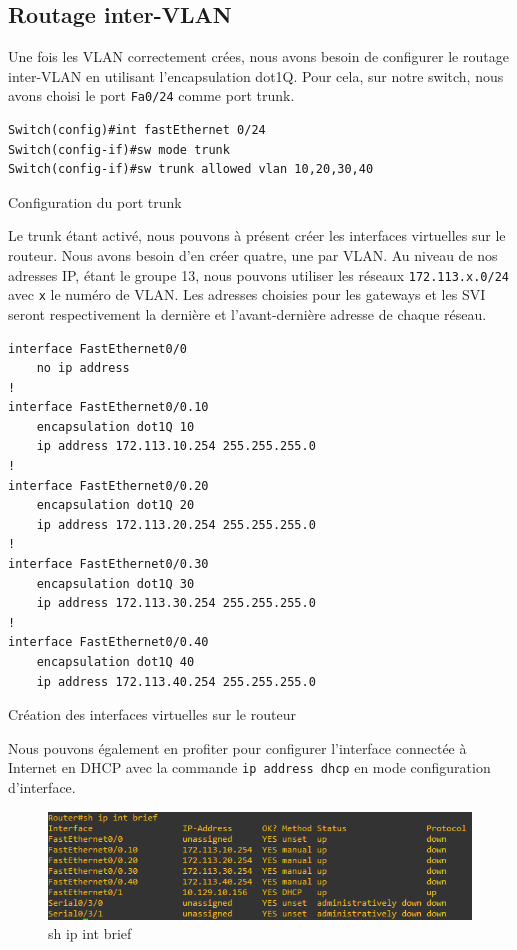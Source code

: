 \documentclass{article}
\begin{document}
\subsection{Routage inter-VLAN}
Une fois les VLAN correctement crées, nous avons besoin de configurer le routage inter-VLAN en utilisant l'encapsulation dot1Q.
Pour cela, sur notre switch, nous avons choisi le port \verb|Fa0/24| comme port trunk.
\begin{listing}[H]
    \begin{verbatim}
Switch(config)#int fastEthernet 0/24
Switch(config-if)#sw mode trunk 
Switch(config-if)#sw trunk allowed vlan 10,20,30,40
    \end{verbatim}
    \caption{Configuration du port trunk}
    \label{reseau:switch:trunk}
\end{listing}
Le trunk étant activé, nous pouvons à présent créer les interfaces virtuelles sur le routeur. Nous avons besoin d'en créer quatre, une par VLAN. 
Au niveau de nos adresses IP, étant le groupe 13, nous pouvons utiliser les réseaux \verb|172.113.x.0/24| avec \verb|x| le numéro de VLAN. Les adresses choisies pour les gateways et les SVI seront respectivement la dernière et l'avant-dernière adresse de chaque réseau.
\begin{listing}[H]
    \begin{verbatim}
interface FastEthernet0/0
    no ip address
!
interface FastEthernet0/0.10
    encapsulation dot1Q 10
    ip address 172.113.10.254 255.255.255.0
!
interface FastEthernet0/0.20
    encapsulation dot1Q 20
    ip address 172.113.20.254 255.255.255.0
!
interface FastEthernet0/0.30
    encapsulation dot1Q 30
    ip address 172.113.30.254 255.255.255.0
!
interface FastEthernet0/0.40
    encapsulation dot1Q 40
    ip address 172.113.40.254 255.255.255.0
    \end{verbatim}
    \caption{Création des interfaces virtuelles sur le routeur}
    \label{router:sub-int}
\end{listing}
Nous pouvons également en profiter pour configurer l'interface connectée à Internet en DHCP avec la commande \verb|ip address dhcp| en mode configuration d'interface.
\begin{figure}[H]
    \includegraphics[width=\linewidth]{fig/router-dhcp.png}
    \caption{sh ip int brief}
    \label{router:shipintbrief}
\end{figure}
\end{document}
